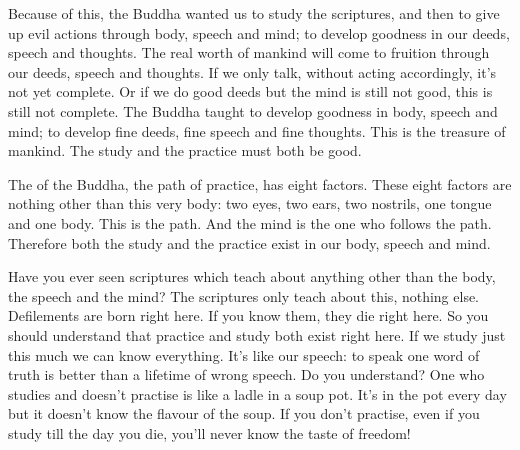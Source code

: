 Because of this, the Buddha wanted us to study the scriptures, and then to give up evil actions through body, speech and mind; to develop goodness in our deeds, speech and thoughts. The real worth of mankind will come to fruition through our deeds, speech and thoughts. If we only talk, without acting accordingly, it's not yet complete. Or if we do good deeds but the mind is still not good, this is still not complete. The Buddha taught to develop goodness in body, speech and mind; to develop fine deeds, fine speech and fine thoughts. This is the treasure of mankind. The study and the practice must both be good.

The  of the Buddha, the path of practice, has eight factors. These eight factors are nothing other than this very body: two eyes, two ears, two nostrils, one tongue and one body. This is the path. And the mind is the one who follows the path. Therefore both the study and the practice exist in our body, speech and mind.

Have you ever seen scriptures which teach about anything other than the body, the speech and the mind? The scriptures only teach about this, nothing else. Defilements are born right here. If you know them, they die right here. So you should understand that practice and study both exist right here. If we study just this much we can know everything. It's like our speech: to speak one word of truth is better than a lifetime of wrong speech. Do you understand? One who studies and doesn't practise is like a ladle in a soup pot. It's in the pot every day but it doesn't know the flavour of the soup. If you don't practise, even if you study till the day you die, you'll never know the taste of freedom!

